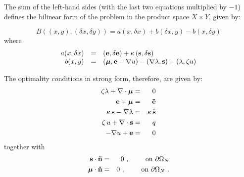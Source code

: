 The sum of the left-hand sides (with the last two equations multiplied by $-1$) defines the bilinear form of the problem in the product space $X \times Y$, given by:

\begin{equation}
	B((x,y),(\delta x,\delta y))=a(x,\delta x)+b(\delta x,y)-b(x,\delta y)
\end{equation}
where
\begin{equation}\label{eq:bform}
	\begin{array}{rcl}
		a(x,\delta x)&=& \left (\mathbf{e},\delta \mathbf{e} \right )+\kappa \left ( \mathbf{s},\delta \mathbf{s} \right ) \\
		b(x,y)& = & \left ( \boldsymbol{\mu},\mathbf{e}-\nabla u \right )-\left (\nabla \lambda,\mathbf{s}\right ) + \left ( \lambda, \zeta u \right )
	\end{array}
\end{equation}

The optimality conditions in strong form, therefore, are given by:
\begin{eqnarray}
	\zeta \lambda  + \nabla \cdot \boldsymbol{\mu} & = & 0 			\label{eq:dif1}\\
	 \mathbf{e} + \boldsymbol{\mu} & = & \mathbf{\tilde{e}} 							\label{eq:dif2}\\
	\kappa\, \mathbf{s} - \nabla \lambda & = & \kappa\,\mathbf{\tilde{s}} 	\label{eq:dif3}\\
	 \zeta\,u+\nabla \cdot \mathbf{s}  & = & q 			\label{eq:dif4}\\
	-\nabla u + \mathbf{e} &=& 0 						\label{eq:dif5}
\end{eqnarray}
together with
\begin{eqnarray}
 \mathbf{s} \cdot \mathbf{\check{n}} & = & 0~,\qquad \mbox{ on } \partial \Omega_N \\
 \boldsymbol{\mu} \cdot \mathbf{\check{n}} & = & 0~,\qquad \mbox{ on } \partial \Omega_N ~.
\end{eqnarray}

